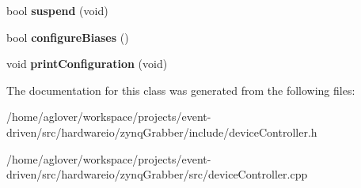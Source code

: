 \begin{DoxyCompactItemize}
\item 
bool {\bfseries suspend} (void)\hypertarget{classvDevCtrl_a9cc8b11acf775f7c7afaf736ffe69c52}{}\label{classvDevCtrl_a9cc8b11acf775f7c7afaf736ffe69c52}

\item 
bool {\bfseries configure\+Biases} ()\hypertarget{classvDevCtrl_a33fb7c392cfdaad5c35b7683eacc61e2}{}\label{classvDevCtrl_a33fb7c392cfdaad5c35b7683eacc61e2}

\item 
void {\bfseries print\+Configuration} (void)\hypertarget{classvDevCtrl_a4fc72bb26da523c7c731b9465e19a5cd}{}\label{classvDevCtrl_a4fc72bb26da523c7c731b9465e19a5cd}

\end{DoxyCompactItemize}


The documentation for this class was generated from the following files\+:\begin{DoxyCompactItemize}
\item 
/home/aglover/workspace/projects/event-\/driven/src/hardwareio/zynq\+Grabber/include/device\+Controller.\+h\item 
/home/aglover/workspace/projects/event-\/driven/src/hardwareio/zynq\+Grabber/src/device\+Controller.\+cpp\end{DoxyCompactItemize}
